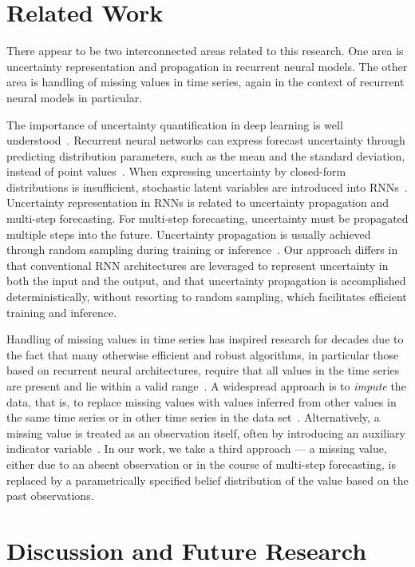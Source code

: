 \documentclass[runningheads]{llncs}
\begin{document}
\section{Related Work} 

There appear to be two interconnected areas related to this
research. One area is uncertainty representation and propagation
in recurrent neural models. The other area is handling of
missing values in time series, again in the context of
recurrent neural models in particular. 

The importance of uncertainty quantification in deep learning is
well understood~\cite{MFS+21}.  Recurrent neural networks can
express forecast uncertainty through predicting distribution
parameters, such as the mean and the standard deviation, instead
of point values~\cite{HS97}. When expressing uncertainty by closed-form
distributions is insufficient, stochastic latent
variables are introduced into RNNs~\cite{YB21,CKD+15,FSK+16}. 
Uncertainty representation in RNNs is related to uncertainty
propagation and multi-step forecasting. For multi-step
forecasting, uncertainty must be propagated multiple steps into
the future. Uncertainty propagation is usually achieved through
random sampling during training or inference~\cite{LYY+19,AV20,YB21}. 
Our approach differs in that conventional RNN architectures are
leveraged to represent uncertainty in both the input and
the output, and that uncertainty propagation is accomplished
deterministically, without resorting to random sampling, which
facilitates efficient training and inference.

Handling of missing values in time series has inspired research
for decades due to the fact that many otherwise efficient and
robust algorithms, in particular those based on recurrent neural
architectures, require that all values in the time series
are present and lie within a valid range~\cite{WSY+21}. A
widespread approach is to \textit{impute} the data,
that is, to replace missing values with values inferred from
other values in the same time series or in other time series
in the data set~\cite{KC18,SYG+19}. Alternatively, a
missing value is treated as an observation itself, often by
introducing an auxiliary indicator variable~\cite{LKW16,BDS21}.
In our work, we take a third approach --- a missing value,
either due to an absent observation or in the course of
multi-step forecasting, is replaced by a parametrically
specified belief distribution of the value based on the past
observations. 

\section{Discussion and Future Research}
\end{document}
